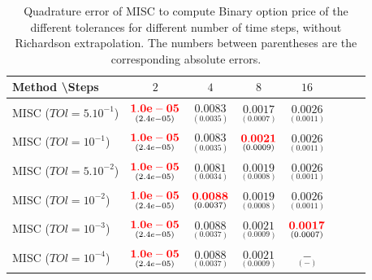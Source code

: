 \documentclass[11pt]{article}
\begin{document}
\begin{table}[h!]
	\centering
	\begin{tabular}{l*{6}{c}r}
		Method \textbackslash  Steps            & $2$ & $4$ & $8$ & $16$  \\
		\hline
		MISC ($TOl=5.10^{-1}$)  & $\underset{(2.4e-05)}{\mathbf{{\color{red}1.0e-05}}}$ & $\underset{(0.0035)}{\mathbf{0.0083}}$  & $\underset{(0.0007)}{\mathbf{ 0.0017}}$ &$\underset{(0.0011)}{\mathbf{0.0026}}$ \\
		MISC ($TOl=10^{-1}$)   & $\underset{(2.4e-05)}{\mathbf{{\color{red}1.0e-05}}}$ & $\underset{(0.0035)}{\mathbf{0.0083}}$ & $\underset{(0.0009)}{\mathbf{{\color{red}0.0021}}}$ & $\underset{(0.0011)}{\mathbf{
				0.0026}}$ \\
		MISC ($TOl=5.10^{-2}$)  & $\underset{(2.4e-05)}{\mathbf{{\color{red}1.0e-05}}}$& $\underset{(0.0034)}{\mathbf{0.0081}}$ & $\underset{(0.0008)}{\mathbf{ 0.0019}}$& $\underset{(0.0011)}{\mathbf{
				0.0026}}$ \\
		MISC ($TOl=10^{-2}$)  & $\underset{(2.4e-05)}{\mathbf{{\color{red}1.0e-05}}}$ & $\underset{(0.0037)}{\mathbf{{\color{red}0.0088}}}$ & $\underset{(0.0008)}{\mathbf{ 0.0019}}$ & $\underset{(0.0011)}{\mathbf{
				0.0026}}$ \\
		MISC ($TOl=10^{-3}$)  & $\underset{(2.4e-05)}{\mathbf{{\color{red}1.0e-05}}}$ & $\underset{(0.0037)}{\mathbf{0.0088}}$& $\underset{(0.0009)}{\mathbf{0.0021}}$& $\underset{(0.0007)}{\mathbf{{\color{red} 0.0017}}}$ \\
			MISC ($TOl=10^{-4}$)  & $\underset{(2.4e-05)}{\mathbf{{\color{red}1.0e-05}}}$ & $\underset{(0.0037)}{\mathbf{0.0088}}$& $\underset{(0.0009)}{\mathbf{0.0021}}$& $\underset{(-)}{\mathbf{ -}}$ \\
		\hline
	\end{tabular}
	\caption{Quadrature error of MISC to compute Binary option price of the different tolerances for different number of time steps, without Richardson extrapolation. The numbers between parentheses are the corresponding absolute errors.}
	\label{Quadrature error of MISC to compute Binary option price of the different tolerances for different number of time steps, without Richardson extrapolation. The numbers between parentheses are the corresponding absolute errors.}
\end{table}
\end{document}
